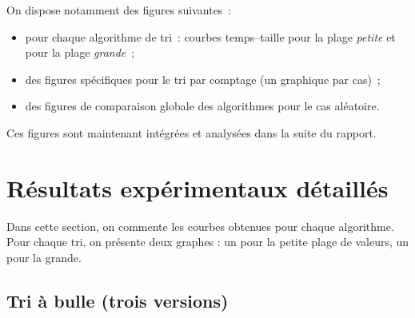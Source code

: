 \documentclass[11pt,a4paper]{article}
\begin{document}
On dispose notamment des figures suivantes~:

\begin{itemize}
  \item pour chaque algorithme de tri~: courbes temps--taille pour la
        plage \emph{petite} et pour la plage \emph{grande}~;
  \item des figures spécifiques pour le tri par comptage (un graphique
        par cas)~;
  \item des figures de comparaison globale des algorithmes pour le cas
        aléatoire.
\end{itemize}

Ces figures sont maintenant intégrées et analysées dans la suite du
rapport.

\section{Résultats expérimentaux détaillés}

Dans cette section, on commente les courbes obtenues pour chaque
algorithme.  
Pour chaque tri, on présente deux graphes : un pour la petite plage de
valeurs, un pour la grande.

\subsection{Tri à bulle (trois versions)}
\end{document}
